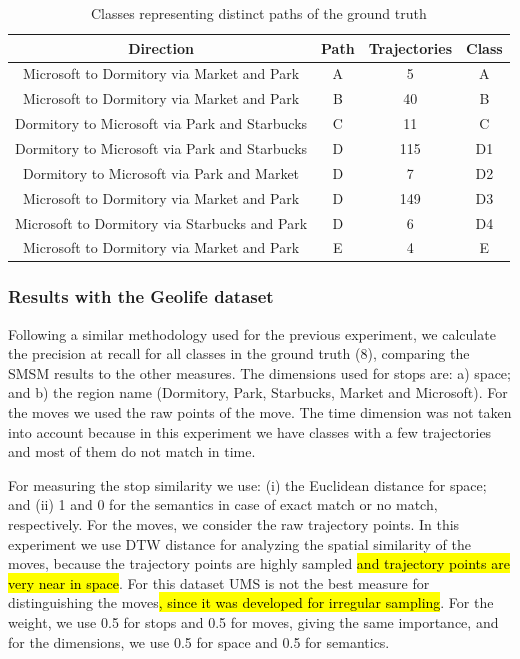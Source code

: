\documentclass[12pt]{article}
\begin{document}
\begin{table}[ht!]
\scriptsize
  \centering
  \begin{tabular}{|c|c|c|c|}
  	\hline
 Direction & Path &  Trajectories & Class \\
  	\hline
Microsoft to Dormitory via Market and Park& A & 5 & A \\
Microsoft to Dormitory via Market and Park& B & 40&B \\
Dormitory to Microsoft via Park and Starbucks& C & 11&C \\
Dormitory to Microsoft via Park and Starbucks& D & 115&D1 \\
Dormitory to Microsoft via Park and Market& D & 7&D2 \\
Microsoft to Dormitory via Market and Park& D & 149&D3 \\
Microsoft to Dormitory via Starbucks and Park& D & 6&D4 \\
Microsoft to Dormitory via Market and Park& E & 4& E \\
    \hline
  \end{tabular}
  \caption{Classes representing distinct paths of the ground truth}
  \label{tab:geolife_dataset}
\end{table}

\subsubsection{Results with the Geolife dataset}

Following a similar methodology used for the previous experiment, we calculate the precision at recall for all classes in the ground truth (8), comparing the SMSM results to the other measures. The dimensions used for stops are: a) space; and b) the region name (Dormitory, Park, Starbucks, Market and Microsoft). For the moves we used the raw points of the move. The time dimension was not taken into account because in this experiment we have classes with a few trajectories and most of them do not match in time.

For measuring the stop similarity we use: (i) the Euclidean distance for space; and (ii) 1 and 0 for the semantics in case of exact match or no match, respectively. For the moves,  we consider the raw trajectory points. In this experiment we use DTW distance for analyzing the spatial similarity of the moves, because the trajectory points are highly sampled \hl{and trajectory points are very near in space}. %
For this dataset UMS is not the best measure for distinguishing the moves\hl{, since it was developed for irregular sampling}. For the weight, we use 0.5 for stops and 0.5 for moves, giving the same importance, and for the dimensions, we use 0.5 for space and 0.5 for semantics.
\end{document}
